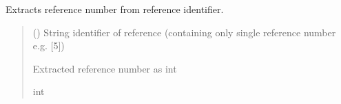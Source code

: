 \documentclass[letterpaper,10pt,english]{sphinxmanual}
\begin{document}
\begin{fulllineitems}
\label{\detokenize{reference_analysis:reference_analysis.extract_number_from_reference_identifier}}
\pysigstartsignatures
\pysiglinewithargsret
{}
{}
{}
\pysigstopsignatures
\sphinxAtStartPar
Extracts reference number from reference identifier.
\begin{quote}\begin{description}
\sphinxAtStartPar
{} () \textendash{} String identifier of reference (containing only single reference number e.g. {[}5{]})

\sphinxAtStartPar
Extracted reference number as int

\sphinxAtStartPar
int

\end{description}\end{quote}

\end{fulllineitems}

\end{document}
